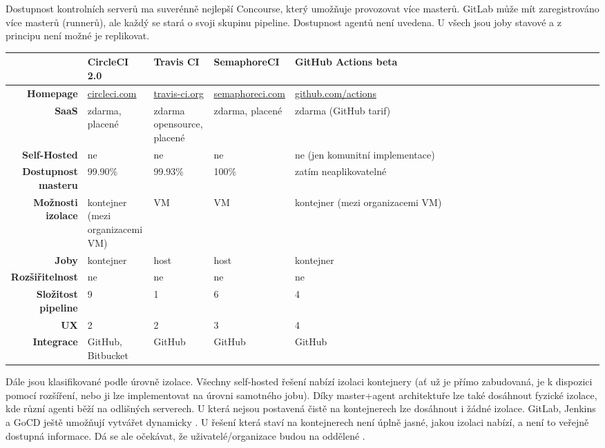     Dostupnost kontrolních serverů ma suverénně nejlepší Concourse, který umožňuje provozovat více masterů. GitLab může mít zaregistrováno více masterů (runnerů), ale každý se stará o svoji skupinu pipeline. Dostupnost agentů není uvedena. U všech \CI jsou joby stavové a z principu není možné je replikovat.

    \newpage
    \vspace*{-0.3cm}
    \begin{adjustwidth}{-2cm}{}
        \begin{tabular}{|r||p{3.2cm}|p{2.7cm}|p{2.9cm}|p{3.2cm}|}\hline
            & \textbf{CircleCI 2.0} & \textbf{Travis CI} & \textbf{SemaphoreCI} & \textbf{GitHub Actions beta} \\\hline\hline
            \textbf{Homepage} & \url{circleci.com} & \url{travis-ci.org} & \url{semaphoreci.com} & \url{github.com/actions} \\\hline
            \textbf{SaaS} & zdarma, placené & zdarma opensource, placené & zdarma, placené & zdarma (GitHub tarif) \\\hline
            \textbf{Self-Hosted} & ne & ne & ne & ne (jen komunitní implementace) \\\hline
            \textbf{Dostupnost masteru} & 99.90\% & 99.93\% & 100\% & zatím neaplikovatelné \\\hline
            \textbf{Možnosti izolace} & kontejner (mezi organizacemi VM) & VM & VM & kontejner (mezi organizacemi VM) \\\hline
            \textbf{Joby} & kontejner & host & host & kontejner\ \ \ \ \ \ \ \ \ \ \ \ \ \ \ \ \ \ \ \ \ \ \ \ \ \ \ \ \ \  \\\hline
            \textbf{Rozšiřitelnost} & ne & ne & ne & ne\ \ \ \ \ \ \ \ \ \ \ \ \ \ \ \ \ \ \ \ \ \ \ \ \ \ \ \ \ \ \ \ \ \ \ \ \ \ \ \ \ \ \ \ \ \ \ \ \ \ \ \ \ \ \ \ \ \ \ \ \\\hline
            \textbf{Složitost pipeline} & 9 & 1 & 6 & 4 \\\hline
            \textbf{UX} & 2 & 2 & 3 & 4 \\\hline
            \textbf{Integrace} & GitHub, Bitbucket & GitHub & GitHub & GitHub \\\hline
        \end{tabular}
    \end{adjustwidth}
    \vspace*{0.3cm}

    Dále jsou \CI klasifikované podle úrovně izolace. Všechny self-hosted řešení nabízí izolaci kontejnery (ať už je přímo zabudovaná, je k dispozici pomocí rozšíření, nebo ji lze implementovat na úrovni samotného jobu). Díky master+agent architektuře lze také dosáhnout fyzické izolace, kde různí agenti běží na odlišných serverech. U \CI která nejsou postavená čistě na kontejnerech lze dosáhnout i žádné izolace. GitLab, Jenkins a GoCD ještě umožňují vytvářet dynamicky . U  řešení která staví na kontejnerech není úplně jasné, jakou izolaci nabízí, a není to veřejně dostupná informace. Dá se ale očekávat, že uživatelé/organizace budou na oddělené .

